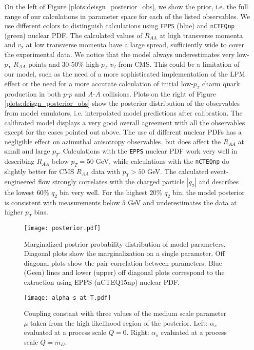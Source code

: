On the left of Figure \ref{plots:deisgn_posterior_obs}, we show the prior, i.e. the full range of our calculations in parameter space for each of the listed observables. 
We use different colors to distinguish calculations using {\tt EPPS} (blue) and
{\tt nCTEQnp} (green) nuclear PDF.
The calculated values of $R_{AA}$ at high transverse momenta and $v_2$ at low transverse momenta have a large spread, sufficiently wide to cover the experimental data.
We notice that the model always underestimates very low-$p_T$ $R_{AA}$ points and 30-50\% high-$p_T$ $v_2$ from CMS.
This could be a limitation of our model, such as the need of a more sophisticated implementation of the LPM effect or the need for a more accurate calculation of initial low-$p_T$ charm quark production in both $p$-$p$ and $A$-$A$ collisions. 
Plots on the right of Figure \ref{plots:deisgn_posterior_obs} show the posterior distribution of the observables from model emulators, i.e. interpolated model predictions after calibration.
The calibrated model displays a very good overall agreement with all the observables except for the cases pointed out above.
The use of different nuclear PDFs has a  negligible effect on azimuthal anisotropy observables, but does affect the $R_{AA}$ at small and large $p_T$.
Calculations with the {\tt EPPS} nuclear PDF work very well in describing $R_{AA}$ below $p_T = 50$ GeV, while calculations with the {\tt nCTEQnp} do slightly better for CMS $R_{AA}$ data with $p_T>50$ GeV.
The calculated event-engineered flow strongly correlates with the charged particle $|q_2|$ and describes the lowest 60\% $q_2$ bin very well.
For the highest 20\% $q_2$ bin, the model posterior is consistent with measurements below $5$ GeV and underestimates the data at higher $p_T$ bins.

\begin{figure}
\texttt{[image: posterior.pdf]}
\caption{Marginalized postrior probability distribution of model parameters. Diagonal plots show the marginalization on a single parameter. Off diagonal plots show the pair correlation between parameters. Blue (Geen) lines and lower (upper) off diagonal plots correspond to the extraction using EPPS (nCTEQ15np) nuclear PDF.}\label{plots:posterior}
\end{figure}
\begin{figure}
\texttt{[image: alpha\_s\_at\_T.pdf]}
\caption{Coupling constant with three values of the medium scale parameter $\mu$ taken  from the high likelihood region of the posterior. Left: $\alpha_s$ evaluated at a process scale $Q=0$. Right: $\alpha_s$ evaluated at a process scale $Q=m_D$.}\label{plots:alphas}
\end{figure}

